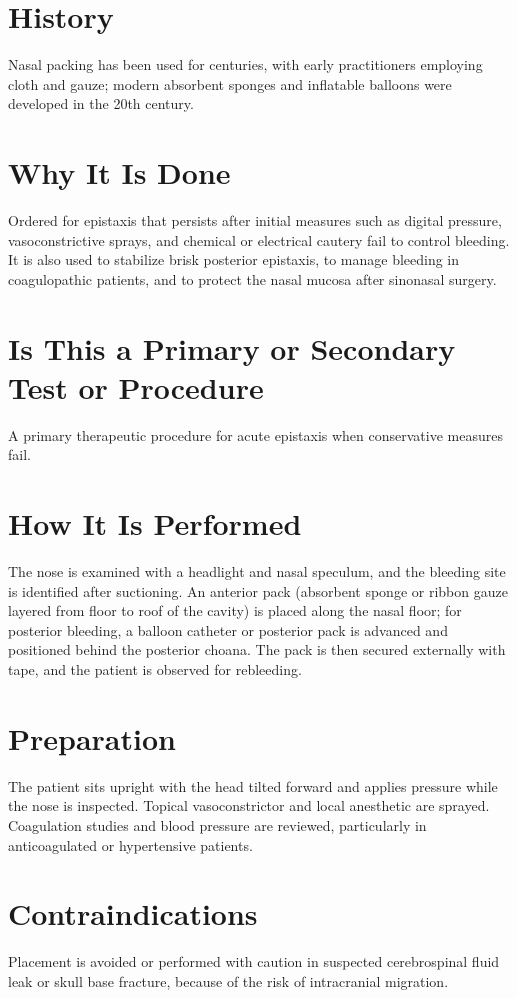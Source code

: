 \section*{History}
Nasal packing has been used for centuries, with early practitioners employing cloth and gauze; modern absorbent sponges and inflatable balloons were developed in the 20th century.

\section*{Why It Is Done}
Ordered for epistaxis that persists after initial measures such as digital pressure, vasoconstrictive sprays, and chemical or electrical cautery fail to control bleeding. It is also used to stabilize brisk posterior epistaxis, to manage bleeding in coagulopathic patients, and to protect the nasal mucosa after sinonasal surgery.

\section*{Is This a Primary or Secondary Test or Procedure}
A primary therapeutic procedure for acute epistaxis when conservative measures fail.

\section*{How It Is Performed}
The nose is examined with a headlight and nasal speculum, and the bleeding site is identified after suctioning. An anterior pack (absorbent sponge or ribbon gauze layered from floor to roof of the cavity) is placed along the nasal floor; for posterior bleeding, a balloon catheter or posterior pack is advanced and positioned behind the posterior choana. The pack is then secured externally with tape, and the patient is observed for rebleeding.

\section*{Preparation}
The patient sits upright with the head tilted forward and applies pressure while the nose is inspected. Topical vasoconstrictor and local anesthetic are sprayed. Coagulation studies and blood pressure are reviewed, particularly in anticoagulated or hypertensive patients.

\section*{Contraindications}
Placement is avoided or performed with caution in suspected cerebrospinal fluid leak or skull base fracture, because of the risk of intracranial migration.

